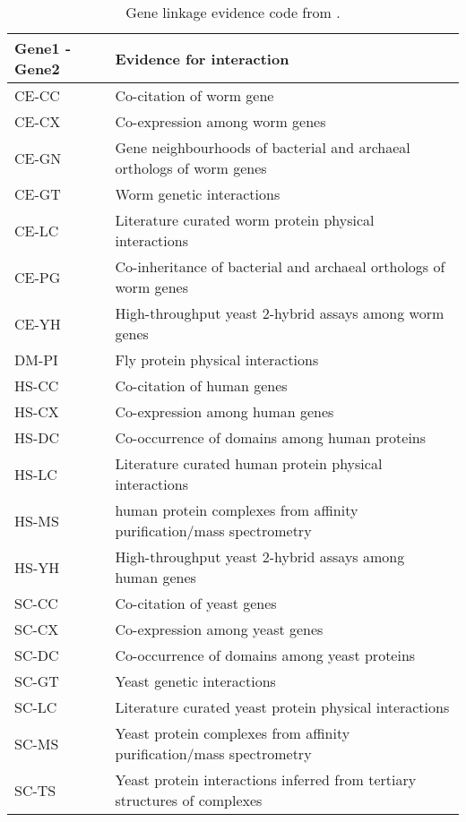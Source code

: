 \begin{table}[!htbp]
    {\renewcommand{\arraystretch}{1.5}
    \begin{tabularx}{0.99\textwidth}{ l X }
    \toprule
	\textbf{Gene1 - Gene2} & \textbf{Evidence for interaction}  \\
    \midrule
	CE-CC & Co-citation of worm gene \\
	CE-CX & Co-expression among worm genes \\
	CE-GN & Gene neighbourhoods of bacterial and archaeal orthologs of worm genes \\
	CE-GT & Worm genetic interactions \\
	CE-LC & Literature curated worm protein physical interactions \\
	CE-PG & Co-inheritance of bacterial and archaeal orthologs of worm genes \\
	CE-YH & High-throughput yeast 2-hybrid assays among worm genes \\
	DM-PI & Fly protein physical interactions \\
	HS-CC & Co-citation of human genes \\
	HS-CX & Co-expression among human genes \\
	HS-DC & Co-occurrence of domains among human proteins \\
	HS-LC & Literature curated human protein physical interactions \\
	HS-MS & human protein complexes from affinity purification/mass spectrometry \\
	HS-YH & High-throughput yeast 2-hybrid assays among human genes \\
	SC-CC & Co-citation of yeast genes \\
	SC-CX & Co-expression among yeast genes \\
	SC-DC & Co-occurrence of domains among yeast proteins \\
	SC-GT & Yeast genetic interactions \\
	SC-LC & Literature curated yeast protein physical interactions \\
	SC-MS & Yeast protein complexes from affinity purification/mass spectrometry \\
	SC-TS & Yeast protein interactions inferred from tertiary structures of complexes \\
    \bottomrule
    \end{tabularx}
	  \caption[Gene linkage evidence code]
	  {Gene linkage evidence code from \cite{WormNet}.
	  \label{table:gene_linkage}}}
\end{table}

